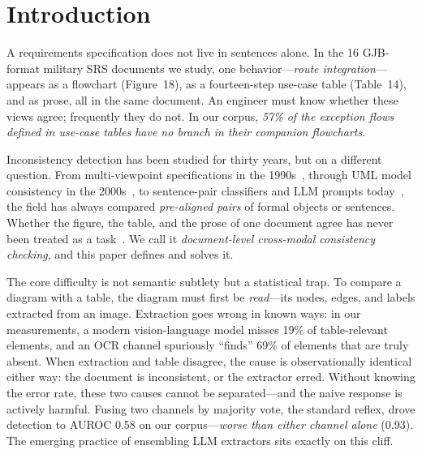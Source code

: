 \documentclass[10pt,twocolumn]{article}
\begin{document}
\section{Introduction}

A requirements specification does not live in sentences alone.  In
the 16 GJB-format military SRS documents we study, one
behavior---\emph{route integration}---appears as a flowchart
(Figure~18), as a fourteen-step use-case table (Table~14), and as
prose, all in the same document.  An engineer must know whether these
views agree; frequently they do not.  In our corpus, \emph{57\% of
the exception flows defined in use-case tables have no branch in
their companion flowcharts}.

Inconsistency detection has been studied for thirty years, but on a
different question.  From multi-viewpoint specifications in the
1990s~\cite{finkelstein1994inconsistency,hunter1998managing}, through
UML model consistency in the
2000s~\cite{engels2001consistent,egyed2006instant}, to sentence-pair
classifiers and LLM prompts
today~\cite{bendik2017checking,wang2025tsrcdf,hasanain2026arareq},
the field has always compared \emph{pre-aligned pairs} of formal
objects or sentences.  Whether the figure, the table, and the prose
of one document agree has never been treated as a
task~\cite{zhao2021nlp4re,zadenoori2025llm4re}.  We call it
\emph{document-level cross-modal consistency checking}, and this
paper defines and solves it.

The core difficulty is not semantic subtlety but a statistical trap.
To compare a diagram with a table, the diagram must first be
\emph{read}---its nodes, edges, and labels extracted from an image.
Extraction goes wrong in known ways: in our measurements, a modern
vision-language model misses 19\% of table-relevant elements, and an
OCR channel spuriously ``finds'' 69\% of elements that are truly
absent.  When extraction and table disagree, the cause is
observationally identical either way: the document is inconsistent,
or the extractor erred.  Without knowing the error rate, these two
causes cannot be separated---and the naive response is actively
harmful.  Fusing two channels by majority vote, the standard
reflex, drove detection to AUROC 0.58 on our corpus---\emph{worse
than either channel alone} (0.93).  The emerging practice of
ensembling LLM extractors sits exactly on this cliff.
\end{document}
